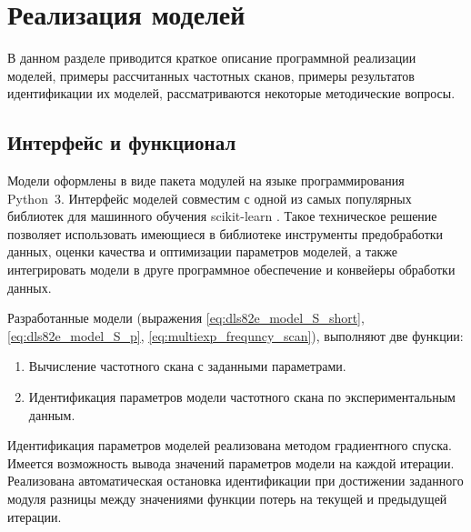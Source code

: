 \section{Реализация моделей}
	В данном разделе приводится краткое описание программной реализации
	моделей, примеры рассчитанных частотных сканов, примеры результатов
	идентификации их моделей, рассматриваются некоторые методические вопросы.


	\subsection{Интерфейс и функционал}
	Модели оформлены в виде пакета модулей на языке программирования Python~3.
	Интерфейс моделей совместим с одной из самых популярных библиотек для 
	машинного обучения scikit-learn \cite{sklearn_website}. Такое техническое
	решение позволяет использовать имеющиеся в библиотеке инструменты 
	предобработки данных, оценки качества и оптимизации параметров 
	моделей, а также интегрировать модели в друге программное обеспечение и 
	конвейеры обработки данных.

	Разработанные модели (выражения	\ref{eq:dls82e_model_S_short}, 
	\ref{eq:dls82e_model_S_p}, \ref{eq:multiexp_frequncy_scan}), выполняют две 
	функции:
	\begin{enumerate}
		\item Вычисление частотного скана с заданными параметрами.
		\item Идентификация параметров модели частотного скана по 
		экспериментальным данным.
	\end{enumerate}
	Идентификация параметров моделей реализована методом градиентного спуска.
	Имеется возможность вывода значений параметров модели на каждой итерации.
	Реализована автоматическая остановка идентификации при достижении заданного
	модуля разницы между значениями функции потерь на текущей и предыдущей 
	итерации.

